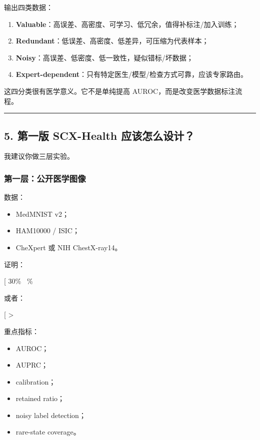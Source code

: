 \documentclass[
  12pt,
]{ctexart}
\providecommand{\tightlist}{%
  \setlength{\itemsep}{0pt}\setlength{\parskip}{0pt}}
\begin{document}
输出四类数据：

\begin{enumerate}
\def\labelenumi{\arabic{enumi}.}
\tightlist
\item
  \textbf{Valuable}：高误差、高密度、可学习、低冗余，值得补标注/加入训练；
\item
  \textbf{Redundant}：低误差、高密度、低差异，可压缩为代表样本；
\item
  \textbf{Noisy}：高误差、低密度、低一致性，疑似错标/坏数据；
\item
  \textbf{Expert-dependent}：只有特定医生/模型/检查方式可靠，应该专家路由。
\end{enumerate}

这四分类很有医学意义。它不是单纯提高 AUROC，而是改变医学数据标注流程。

\begin{center}\rule{0.5\linewidth}{0.5pt}\end{center}

\subsection{5. 第一版 SCX-Health
应该怎么设计？}\label{ux7b2cux4e00ux7248-scx-health-ux5e94ux8be5ux600eux4e48ux8bbeux8ba1}

我建议你做三层实验。

\subsubsection{第一层：公开医学图像}\label{ux7b2cux4e00ux5c42ux516cux5f00ux533bux5b66ux56feux50cf}

数据：

\begin{itemize}
\tightlist
\item
  MedMNIST v2；
\item
  HAM10000 / ISIC；
\item
  CheXpert 或 NIH ChestX-ray14。
\end{itemize}

证明：

{[} 30\%~ \%~\text{full data performance}{]}

或者：

{[}  \textgreater{}
\text{random/diversity/uncertainty/high-loss}{]}

重点指标：

\begin{itemize}
\tightlist
\item
  AUROC；
\item
  AUPRC；
\item
  calibration；
\item
  retained ratio；
\item
  noisy label detection；
\item
  rare-state coverage。
\end{itemize}
\end{document}
